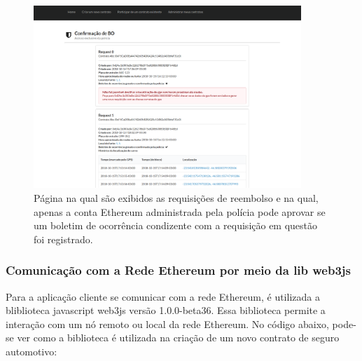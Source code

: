 \begin{figure}[h!]
\centering
\includegraphics[width=0.9\textwidth]{Cap2/confirm_bo.png}
\caption{Página na qual são exibidos as requisições de reembolso e na qual, apenas a conta Ethereum administrada pela polícia pode aprovar se um boletim de ocorrência condizente com a requisição em questão foi registrado.}
\label{confirm_bo}
\end{figure}

\clearpage
\subsubsection{Comunicação com a Rede Ethereum por meio da lib web3js}

Para a aplicação cliente se comunicar com a rede Ethereum, é utilizada a bliblioteca javascript web3js versão 1.0.0-beta36. Essa biblioteca permite a interação com um nó remoto ou local da rede Ethereum. No código abaixo, pode-se ver como a biblioteca é utilizada na criação de um novo contrato de seguro automotivo:

